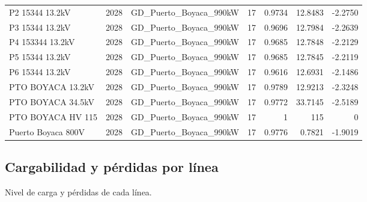 \documentclass[11pt,a4paper]{article}
\begin{document}
\begin{longtable}{llllrrr}
P2 15344 13.2kV & 2028 & GD\_Puerto\_Boyaca\_990kW & 17 & 0.9734 & 12.8483 & -2.2750 \\
P3 15344 13.2kV & 2028 & GD\_Puerto\_Boyaca\_990kW & 17 & 0.9696 & 12.7984 & -2.2639 \\
P4 153344 13.2kV & 2028 & GD\_Puerto\_Boyaca\_990kW & 17 & 0.9685 & 12.7848 & -2.2129 \\
P5 15344 13.2kV & 2028 & GD\_Puerto\_Boyaca\_990kW & 17 & 0.9685 & 12.7845 & -2.2119 \\
P6 15344 13.2kV & 2028 & GD\_Puerto\_Boyaca\_990kW & 17 & 0.9616 & 12.6931 & -2.1486 \\
PTO BOYACA 13.2kV & 2028 & GD\_Puerto\_Boyaca\_990kW & 17 & 0.9789 & 12.9213 & -2.3248 \\
PTO BOYACA 34.5kV & 2028 & GD\_Puerto\_Boyaca\_990kW & 17 & 0.9772 & 33.7145 & -2.5189 \\
PTO BOYACA HV 115 & 2028 & GD\_Puerto\_Boyaca\_990kW & 17 & 1 & 115 & 0 \\
Puerto Boyaca 800V & 2028 & GD\_Puerto\_Boyaca\_990kW & 17 & 0.9776 & 0.7821 & -1.9019 \\
\end{longtable}

\subsection{Cargabilidad y p\'erdidas por l\'inea}

Nivel de carga y p\'erdidas de cada l\'inea.
\end{document}
